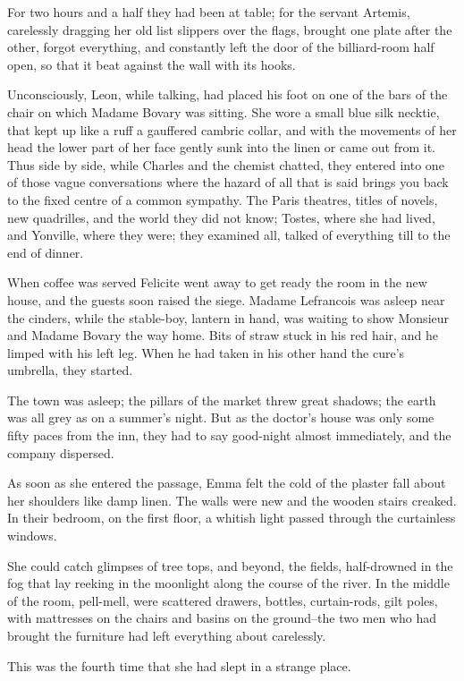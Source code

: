 \documentclass{tufte-book}
\begin{document}
For two hours and a half they had been at table; for the servant
Artemis, carelessly dragging her old list slippers over the flags,
brought one plate after the other, forgot everything, and constantly
left the door of the billiard-room half open, so that it beat against
the wall with its hooks.

Unconsciously, Leon, while talking, had placed his foot on one of the
bars of the chair on which Madame Bovary was sitting. She wore a small
blue silk necktie, that kept up like a ruff a gauffered cambric collar,
and with the movements of her head the lower part of her face gently
sunk into the linen or came out from it. Thus side by side, while
Charles and the chemist chatted, they entered into one of those vague
conversations where the hazard of all that is said brings you back to
the fixed centre of a common sympathy. The Paris theatres, titles of
novels, new quadrilles, and the world they did not know; Tostes, where
she had lived, and Yonville, where they were; they examined all, talked
of everything till to the end of dinner.

When coffee was served Felicite went away to get ready the room in the
new house, and the guests soon raised the siege. Madame Lefrancois was
asleep near the cinders, while the stable-boy, lantern in hand, was
waiting to show Monsieur and Madame Bovary the way home. Bits of straw
stuck in his red hair, and he limped with his left leg. When he had
taken in his other hand the cure's umbrella, they started.

The town was asleep; the pillars of the market threw great shadows; the
earth was all grey as on a summer's night. But as the doctor's house was
only some fifty paces from the inn, they had to say good-night almost
immediately, and the company dispersed.

As soon as she entered the passage, Emma felt the cold of the plaster
fall about her shoulders like damp linen. The walls were new and the
wooden stairs creaked. In their bedroom, on the first floor, a whitish
light passed through the curtainless windows.

She could catch glimpses of tree tops, and beyond, the fields,
half-drowned in the fog that lay reeking in the moonlight along
the course of the river. In the middle of the room, pell-mell, were
scattered drawers, bottles, curtain-rods, gilt poles, with mattresses
on the chairs and basins on the ground--the two men who had brought the
furniture had left everything about carelessly.

This was the fourth time that she had slept in a strange place.
\end{document}
